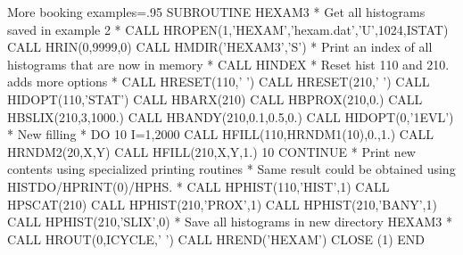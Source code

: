 \begin{XMPt}{More booking examples}\baselineskip=.95\baselineskip\relax
      SUBROUTINE HEXAM3
*             Get all histograms saved in example 2
*
      CALL HROPEN(1,'HEXAM','hexam.dat','U',1024,ISTAT)
      CALL HRIN(0,9999,0)
      CALL HMDIR('HEXAM3','S')
*             Print an index of all histograms that are now in memory
*
      CALL HINDEX
*             Reset hist 110 and 210.  adds more options
*
      CALL HRESET(110,' ')
      CALL HRESET(210,' ')
      CALL HIDOPT(110,'STAT')
      CALL HBARX(210)
      CALL HBPROX(210,0.)
      CALL HBSLIX(210,3,1000.)
      CALL HBANDY(210,0.1,0.5,0.)
      CALL HIDOPT(0,'1EVL')
*             New filling
*
      DO 10 I=1,2000
         CALL HFILL(110,HRNDM1(10),0.,1.)
         CALL HRNDM2(20,X,Y)
         CALL HFILL(210,X,Y,1.)
  10  CONTINUE
*             Print new contents using specialized printing routines
*             Same result could be obtained using HISTDO/HPRINT(0)/HPHS.
*
      CALL HPHIST(110,'HIST',1)
      CALL HPSCAT(210)
      CALL HPHIST(210,'PROX',1)
      CALL HPHIST(210,'BANY',1)
      CALL HPHIST(210,'SLIX',0)
*             Save all histograms in new directory HEXAM3
*
      CALL HROUT(0,ICYCLE,' ')
      CALL HREND('HEXAM')
      CLOSE (1)
      END
\end{XMPt}
\finalnewpage
